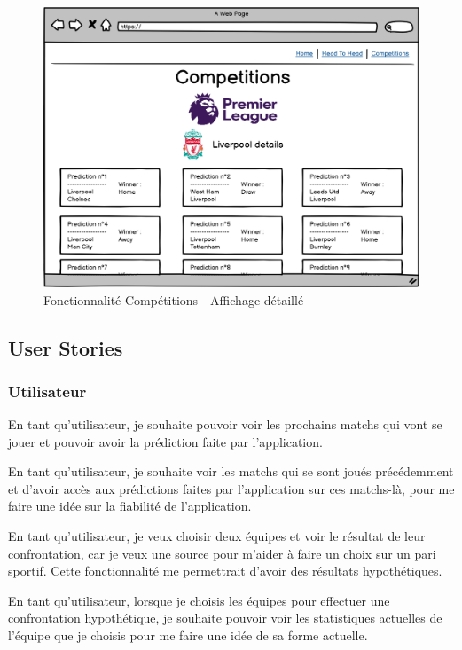 \documentclass[a4paper,14pt]{extarticle}
\begin{document}
{\begin{figure}[H]
    \centering
    \includegraphics[width=13cm]{../img/maquetteCompetitions_4.png}
    \caption{Fonctionnalité Compétitions - Affichage détaillé}
    \label{fig:maquetteCompetitions_4}
\end{figure}

\subsection{User Stories}

\subsubsection{Utilisateur}

En tant qu’utilisateur, je souhaite pouvoir voir les prochains matchs qui vont se jouer et pouvoir avoir la prédiction faite par l’application. 

En tant qu’utilisateur, je souhaite voir les matchs qui se sont joués précédemment et d’avoir accès aux prédictions faites par l’application sur ces matchs-là, pour me faire une idée sur la fiabilité de l’application. 

En tant qu’utilisateur, je veux choisir deux équipes et voir le résultat de leur confrontation, car je veux une source pour m’aider à faire un choix sur un pari sportif. Cette fonctionnalité me permettrait d’avoir des résultats hypothétiques. 

En tant qu’utilisateur, lorsque je choisis les équipes pour effectuer une confrontation hypothétique, je souhaite pouvoir voir les statistiques actuelles de l’équipe que je choisis pour me faire une idée de sa forme actuelle. 

}
\end{document}
